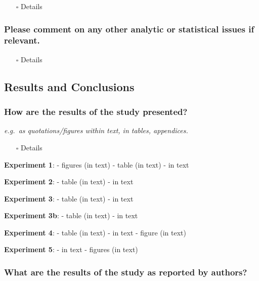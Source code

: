 \documentclass[
  doc, a4paper]{apa7}
\providecommand{\tightlist}{%
  \setlength{\itemsep}{0pt}\setlength{\parskip}{0pt}}
\begin{document}
\begin{itemize}
\tightlist
\item[$\square$]
  Details
\end{itemize}

\subsubsection{Please comment on any other analytic or statistical issues if relevant.}\label{please-comment-on-any-other-analytic-or-statistical-issues-if-relevant.}

\begin{itemize}
\tightlist
\item[$\square$]
  Details
\end{itemize}

\subsection{Results and Conclusions}\label{results-and-conclusions}

\subsubsection{How are the results of the study presented?}\label{how-are-the-results-of-the-study-presented}

\emph{e.g.~as quotations/figures within text, in tables, appendices.}

\begin{itemize}
\tightlist
\item[$\square$]
  Details
\end{itemize}

\textbf{Experiment 1}:
- figures (in text)
- table (in text)
- in text

\textbf{Experiment 2}:
- table (in text)
- in text

\textbf{Experiment 3}:
- table (in text)
- in text

\textbf{Experiment 3b}:
- table (in text)
- in text

\textbf{Experiment 4}:
- table (in text)
- in text
- figure (in text)

\textbf{Experiment 5}:
- in text
- figures (in text)

\subsubsection{What are the results of the study as reported by authors?}\label{what-are-the-results-of-the-study-as-reported-by-authors}
\end{document}
